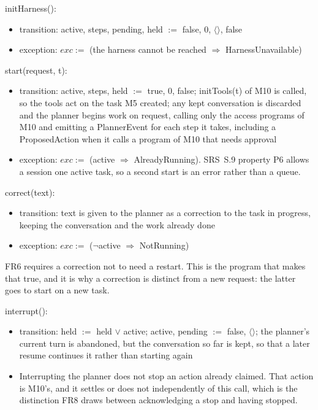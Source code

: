 \documentclass[12pt, titlepage]{article}
\begin{document}
\noindent initHarness():
\begin{itemize}
\item transition: active, steps, pending, held $:=$ false, 0, $\langle\rangle$,
false
\item exception: $exc :=$ (the harness cannot be reached $\Rightarrow$
HarnessUnavailable)
\end{itemize}

\noindent start(request, t):
\begin{itemize}
\item transition: active, steps, held $:=$ true, 0, false; initTools(t) of M10
is called, so the tools act on the task M5 created; any kept
conversation is discarded and the planner begins work on
request, calling only the access programs of M10 and emitting a PlannerEvent for
each step it takes, including a ProposedAction when it calls a program of M10
that needs approval
\item exception: $exc :=$ (active $\Rightarrow$ AlreadyRunning). SRS~S.9
property P6 allows a session one active task, so a second start is an error
rather than a queue.
\end{itemize}

\noindent correct(text):
\begin{itemize}
\item transition: text is given to the planner as a correction to the task in
progress, keeping the conversation and the work already done
\item exception: $exc :=$ ($\lnot$active $\Rightarrow$ NotRunning)
\end{itemize}

\noindent FR6 requires a correction not to need a restart. This is the program
that makes that true, and it is why a correction is distinct from a new request:
the latter goes to start on a new task.

\noindent interrupt():
\begin{itemize}
\item transition: held $:=$ held $\vee$ active; active, pending $:=$ false,
$\langle\rangle$; the planner's current turn is abandoned, but the conversation
so far is kept, so that a later resume continues it rather than starting again
\item Interrupting the planner does not stop an action already claimed. That
action is M10's, and it settles or does not independently of this call, which is
the distinction FR8 draws between acknowledging a stop and having stopped.
\end{itemize}
\end{document}
